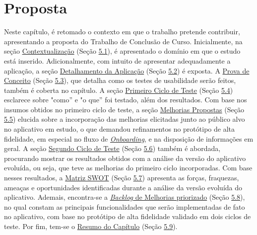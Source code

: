 \chapter[Proposta]{Proposta}
\label{chap:Proposta}
Neste capítulo, é retomado o contexto em que o trabalho pretende contribuir, apresentando a proposta do Trabalho de Conclusão de Curso. Inicialmente, na seção \hyperref[sec:Contextualizacao]{Contextualização} (Seção \hyperref[sec:Contextualizacao]{5.1}), é 
apresentado o domínio em que o estudo está inserido. Adicionalmente, com intuito de apresentar adequadamente a aplicação, a seção \hyperref[sec:Detalhamento da Aplicacao]{Detalhamento da Aplicação} (Seção \hyperref[sec:Detalhamento da Aplicacao]{5.2}) é exposta. 
A \hyperref[sec:Prova de Conceito]{Prova de Conceito} (Seção \hyperref[sec:Detalhamento da Aplicacao]{5.3}), que detalha como os testes de usabilidade serão  feitos, também é coberta no capítulo. A seção \hyperref[sec:Primeiro Ciclo]{Primeiro Ciclo de Teste} (Seção \hyperref[sec:Primeiro Ciclo]{5.4}) 
esclarece sobre "como'' e "o que'' foi testado, além dos resultados. Com base nos insumos obtidos no primeiro ciclo de teste, a seção \hyperref[sec:Melhorias Propostas]{Melhorias Propostas} (Seção \hyperref[sec:Melhorias Propostas]{5.5}) elucida sobre a incorporação das melhorias elicitadas junto ao público 
alvo no aplicativo em estudo, o que demandou refinamentos no protótipo de alta fidelidade, em especial no fluxo de \hyperref[sec:Onboarding]{\textit{Onboarding}}, e na disposição de informações em geral. A seção \hyperref[sec:Segundo Ciclo]{Segundo Ciclo de Teste} (Seção \hyperref[sec:Segundo Ciclo]{5.6}) 
também é abordada, procurando mostrar os resultados obtidos com a análise da versão do aplicativo evoluída, ou seja, que teve as melhorias do primeiro ciclo incorporadas. Com base nesses resultados, a \hyperref[sec:Matriz SWOT]{Matriz SWOT} (Seção \hyperref[sec:Matriz SWOT]{5.7}) apresenta as forças, fraquezas, 
ameaças e oportunidades identificadas durante a análise da versão evoluída do aplicativo. Ademais, encontra-se a \hyperref[sec:Backlog de Melhorias]{\textit{Backlog} de Melhorias priorizado} (Seção \hyperref[sec:Backlog de Melhorias]{5.8}), no qual constam as principais funcionalidades que serão implementadas 
de fato no aplicativo, com base no protótipo de alta fidelidade validado em dois ciclos de teste. Por fim, tem-se o \hyperref[sec:Resumo Proposta]{Resumo do Capítulo} (Seção \hyperref[sec:Resumo Proposta]{5.9}).

